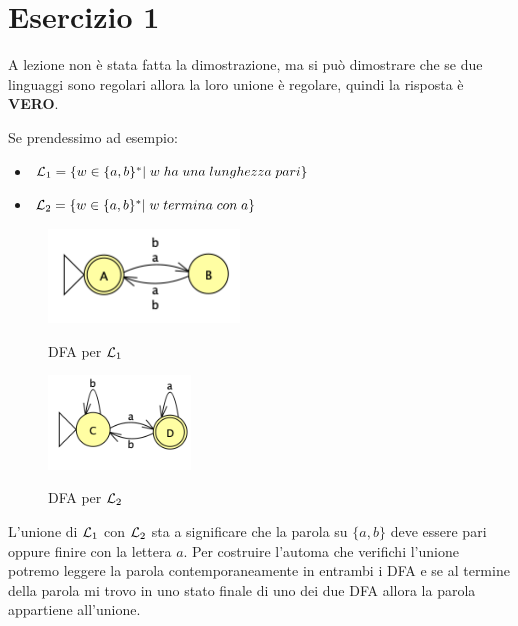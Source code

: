 \documentclass[11pt]{article}
\begin{document}
\section*{Esercizio 1}
A lezione non è stata fatta la dimostrazione, ma si può dimostrare
che se due linguaggi sono regolari allora la loro unione è regolare, quindi la risposta è \textbf{VERO}.
\begin{tcolorbox}[colframe=orange!70!black, colback=orange!10!white, title=\textbf{\textit{Nota \sout{inutile ai fini dell'esercizio}:}}]
Se prendessimo ad esempio:
\begin{itemize}
  \item ${\cal L}_1 = \{w \in \{a,b\}^*|\;w\;ha\;una\;lunghezza\;pari\}$  
  \item ${\cal L}_2 = \{w \in \{a,b\}^*|\;w\;termina\;con\;a\}$  
\end{itemize}
\begin{multicols}{2}
  \begin{figure}[H]
  \centering
    \includegraphics[height=2.5cm]{img/01Pari.png}
    \label{fig:01-DFA-pari}
    \caption*{DFA per ${\cal L}_1$}
  \end{figure}
  \begin{figure}[H]
  \centering
    \includegraphics[height=2.5cm]{img/01FinisceConA.png}
    \label{fig:01-DFA-finisce-con-a}
    \caption*{DFA per ${\cal L}_2$}
  \end{figure}
\end{multicols}
L'unione di  ${\cal L}_1$ con  ${\cal L}_2$ sta a significare che la 
parola su $\{a, b\}$ deve essere pari oppure finire con la lettera $a$.
Per costruire l'automa che verifichi l'unione potremo leggere la parola
contemporaneamente in entrambi i DFA e se al termine della parola mi 
trovo in uno stato finale di uno dei due DFA allora la parola appartiene
all'unione.


\end{tcolorbox}
\end{document}
